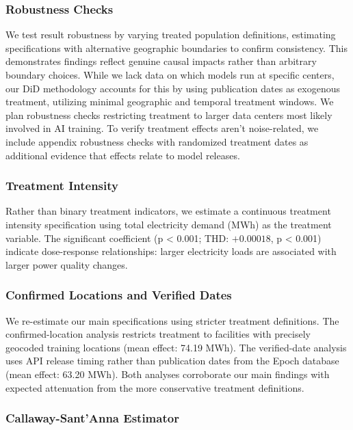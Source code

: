 \documentclass[sigconf,authordraft]{acmart}
\newcommand{\nb}[1]{\textcolor{blue}{NB[#1]}}
\begin{document}
\subsubsection{Robustness Checks}
We test result robustness by varying treated population definitions, estimating specifications with alternative geographic boundaries to confirm consistency. This demonstrates findings reflect genuine causal impacts rather than arbitrary boundary choices. While we lack data on which models run at specific centers, our DiD methodology accounts for this by using publication dates as exogenous treatment, utilizing minimal geographic and temporal treatment windows. We plan robustness checks restricting treatment to larger data centers most likely involved in AI training. To verify treatment effects aren't noise-related, we include appendix robustness checks with randomized treatment dates as additional evidence that effects relate to model releases.

\subsubsection{Treatment Intensity}

Rather than binary treatment indicators, we estimate a continuous treatment intensity specification using total electricity demand (MWh) as the treatment variable. The significant coefficient (p < 0.001; THD: $+0.00018$, p < 0.001) indicate dose-response relationships: larger electricity loads are associated with larger power quality changes.

\subsubsection{Confirmed Locations and Verified Dates}

We re-estimate our main specifications using stricter treatment definitions. The confirmed-location analysis restricts treatment to facilities with precisely geocoded training locations (mean effect: 74.19 MWh). The verified-date analysis uses API release timing rather than publication dates from the Epoch database (mean effect: 63.20 MWh). Both analyses corroborate our main findings with expected attenuation from the more conservative treatment definitions.

\subsubsection{Callaway-Sant'Anna Estimator}
\end{document}
